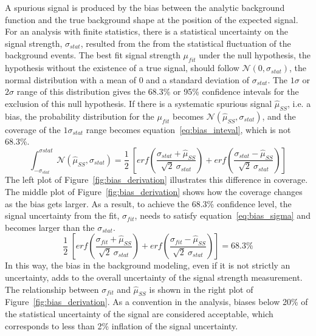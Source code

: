 A spurious signal is produced by the bias between the analytic background function and the true background shape at the position of the expected signal.
For an analysis with finite statistics, there is a statistical uncertainty on the signal strength, $\sigma_{stat}$,
resulted from the from the statistical fluctuation of the background events.
The best fit signal strength $\mu_{fit}$ under the null hypothesis, the hypothesis without the existence of a true signal,
should follow $\mathcal{N}(0, \sigma_{stat})$, the normal distribution with a mean of 0 and a standard deviation of $\sigma_{stat}$.
The $1\sigma$ or $2\sigma$ range of this distribution gives the 68.3\% or 95\% confidence intevals for the exclusion of this null hypothesis.
If there is a systematic spurious signal $\hat{\mu}_{SS}$, i.e. a bias, the probability distribution for the $\mu_{fit}$ becomes $\mathcal{N}(\hat{\mu}_{SS}, \sigma_{stat})$,
and the coverage of the $1\sigma_{stat}$ range becomes equation~\ref{eq:bias_inteval}, which is not 68.3\%.
\begin{equation}\label{eq:bias_inteval}
  \int_{-\sigma_{stat}}^{\sigma{stat}} \mathcal{N}(\hat{\mu}_{SS}, \sigma_{stat}) = \frac{1}{2} ~[erf(\frac{\sigma_{stat}+\hat{\mu}_{SS}}{\sqrt{2}~\sigma_{stat}}) + erf(\frac{\sigma_{stat}-\hat{\mu}_{SS}}{\sqrt{2}~\sigma_{stat}})]
\end{equation}
The left plot of Figure~\ref{fig:bias_derivation} illustrates this difference in coverage.
The middle plot of Figure~\ref{fig:bias_derivation} shows how the coverage changes as the bias gets larger.  
As a result, to achieve the 68.3\% confidence level, the signal uncertainty from the fit, $\sigma_{fit}$, 
needs to satisfy equation~\ref{eq:bias_sigma} and becomes larger than the $\sigma_{stat}$. 
\begin{equation}\label{eq:bias_sigma}
  \frac{1}{2} ~[erf(\frac{\sigma_{fit}+\hat{\mu}_{SS}}{\sqrt{2}~\sigma_{stat}}) + erf(\frac{\sigma_{fit}-\hat{\mu}_{SS}}{\sqrt{2}~\sigma_{stat}})] = 68.3\%
\end{equation}
In this way, the bias in the background modeling, even if it is not strictly an uncertainty, 
adds to the overall uncertainty of the signal strength measurement.
The relationship between $\sigma_{fit}$ and $\hat{\mu}_{SS}$ is shown in the right plot of Figure~\ref{fig:bias_derivation}.
As a convention in the \hmm analysis, biases below 20\% of the statistical uncertainty of the signal are considered acceptable,
which corresponds to less than 2\% inflation of the signal uncertainty.

